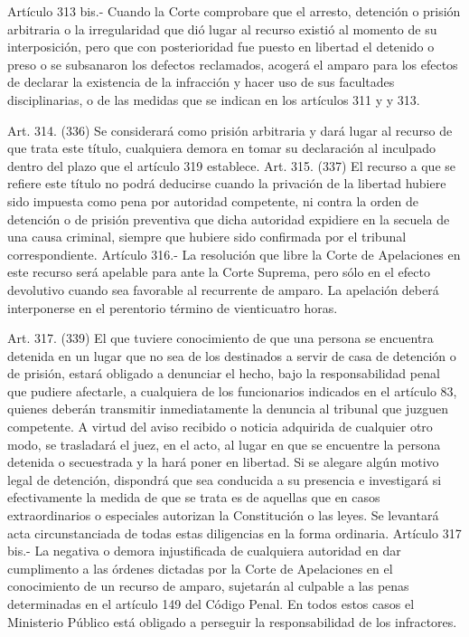     Artículo 313 bis.- Cuando la Corte comprobare que el arresto, detención o prisión arbitraria o la irregularidad que dió lugar al recurso existió al momento de su interposición, pero que con posterioridad fue puesto en libertad el detenido o preso o se subsanaron los defectos reclamados, acogerá el amparo para los efectos de declarar la existencia de la infracción y hacer uso de sus facultades disciplinarias, o de las medidas que se indican en los artículos 311 y y 313.

    Art. 314. (336) Se considerará como prisión arbitraria y dará lugar al recurso de que trata este título, cualquiera demora en tomar su declaración al inculpado dentro del plazo que el artículo 319 establece.
    Art. 315. (337) El recurso a que se refiere este título no podrá deducirse cuando la privación de la libertad hubiere sido impuesta como pena por autoridad competente, ni contra la orden de detención o de prisión preventiva que dicha autoridad expidiere en la secuela de una causa criminal, siempre que hubiere sido confirmada por el tribunal correspondiente.
    Artículo 316.- La resolución que libre la Corte de Apelaciones en este recurso será apelable para ante la Corte Suprema, pero sólo en el efecto devolutivo cuando sea favorable al recurrente de amparo.
    La apelación deberá interponerse en el perentorio término de vienticuatro horas.

    Art. 317. (339) El que tuviere conocimiento de que una persona se encuentra detenida en un lugar que no sea de los destinados a servir de casa de detención o de prisión, estará obligado a denunciar el hecho, bajo la responsabilidad penal que pudiere afectarle, a cualquiera de los funcionarios indicados en el artículo 83, quienes deberán transmitir inmediatamente la denuncia al tribunal que juzguen competente.
    A virtud del aviso recibido o noticia adquirida de cualquier otro modo, se trasladará el juez, en el acto, al lugar en que se encuentre la persona detenida o secuestrada y la hará poner en libertad. Si se alegare algún motivo legal de detención, dispondrá que sea conducida a su presencia e investigará si efectivamente la medida de que se trata es de aquellas que en casos extraordinarios o especiales autorizan la Constitución o las leyes.
    Se levantará acta circunstanciada de todas estas diligencias en la forma ordinaria.
    Artículo 317 bis.- La negativa o demora injustificada de cualquiera autoridad en dar cumplimento a las órdenes dictadas por la Corte de Apelaciones en el conocimiento de un recurso de amparo, sujetarán al culpable a las penas determinadas en el artículo 149 del Código Penal. En todos estos casos el Ministerio Público está obligado a perseguir la responsabilidad de los infractores.

